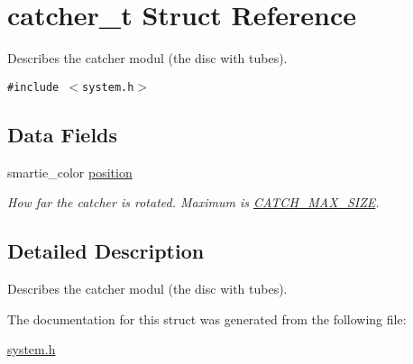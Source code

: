 \hypertarget{structcatcher__t}{
\section{catcher\_\-t Struct Reference}
\label{structcatcher__t}
}
Describes the catcher modul (the disc with tubes).  


{\tt \#include $<$system.h$>$}

\subsection*{Data Fields}
\begin{CompactItemize}
\item 
\hypertarget{structcatcher__t_4adca5b59526beb836401fcb39a408ab}{
smartie\_\-color \hyperlink{structcatcher__t_4adca5b59526beb836401fcb39a408ab}{position}}
\label{structcatcher__t_4adca5b59526beb836401fcb39a408ab}

\begin{CompactList}\small\item\em How far the catcher is rotated. Maximum is \hyperlink{system_8h_ebeee5d587e924ad6d94000c311f24af}{CATCH\_\-MAX\_\-SIZE}. \item\end{CompactList}\end{CompactItemize}


\subsection{Detailed Description}
Describes the catcher modul (the disc with tubes). 

The documentation for this struct was generated from the following file:\begin{CompactItemize}
\item 
\hyperlink{system_8h}{system.h}\end{CompactItemize}
